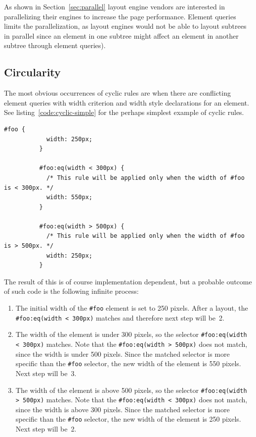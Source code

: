 \documentclass[a4paper,11pt]{kth-mag}
\newcommand{\code}[1]{\texttt{#1}}
\begin{document}
        As shown in Section~\ref{sec:parallel} \gls{layout engine} vendors are interested in parallelizing their engines to increase the page performance.
        Element queries limits the parallelization, as \glspl{layout engine} would not be able to layout subtrees in parallel since an \gls{element} in one subtree might affect an \gls{element} in another subtree through element queries).

      \subsection{Circularity}\label{sec:cyclic-rules}
        The most obvious occurrences of cyclic rules are when there are conflicting element queries with width criterion and width style declarations for an \gls{element}.
        See listing~\ref{code:cyclic-simple} for the perhaps simplest example of cyclic rules.
        \begin{lstlisting}[gobble=10,caption={Simple example of cyclic rules with directly conflicting width element queries criterion and declarations. Recall the element queries psuedo syntax defined in Section~\ref{sec:eq-definitions}.}, captionpos=b, label={code:cyclic-simple}]
          #foo {
            width: 250px;
          }

          #foo:eq(width < 300px) {
            /* This rule will be applied only when the width of #foo is < 300px. */
            width: 550px;
          }

          #foo:eq(width > 500px) {
            /* This rule will be applied only when the width of #foo is > 500px. */
            width: 250px;
          }
        \end{lstlisting}
        The result of this is of course implementation dependent, but a probable outcome of such code is the following infinite process:
        \begin{enumerate}
          \item 
            The initial width of the \code{\#foo} \gls{element} is set to 250 pixels.
            After a layout, the \code{\#foo:eq(width < 300px)} matches and therefore next step will be~2.
          \item 
            The width of the \gls{element} is under 300 pixels, so the selector \code{\#foo:eq(width < 300px)} matches.
            Note that the \code{\#foo:eq(width > 500px)} does not match, since the width is under 500 pixels.
            Since the matched selector is more specific than the \code{\#foo} selector, the new width of the \gls{element} is 550 pixels.
            Next step will be~3.
          \item 
            The width of the \gls{element} is above 500 pixels, so the selector \code{\#foo:eq(width > 500px)} matches.
            Note that the \code{\#foo:eq(width < 300px)} does not match, since the width is above 300 pixels.
            Since the matched selector is more specific than the \code{\#foo} selector, the new width of the \gls{element} is 250 pixels.
            Next step will be~2.
        \end{enumerate}
\end{document}
